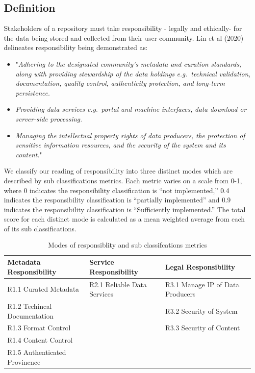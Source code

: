 \documentclass{article}
\begin{document}
\hypertarget{definition}{%
\subsection{Definition}\label{definition}}

Stakeholders of a repository must take responsibility - legally and
ethically- for the data being stored and collected from their user
community. Lin et al (2020) delineates responsibility being demonstrated
as:

\begin{itemize}
\item
  "\emph{Adhering to the designated community's metadata and curation
  standards, along with providing stewardship of the data holdings
  e.g.~technical validation, documentation, quality control,
  authenticity protection, and long-term persistence.}
\item
  \emph{Providing data services e.g.~portal and machine interfaces, data
  download or server-side processing.}
\item
  \emph{Managing the intellectual property rights of data producers, the
  protection of sensitive information resources, and the security of the
  system and its content.}"
\end{itemize}

We classify our reading of responsibility into three distinct modes
which are described by sub classifications metrics. Each metric varies
on a scale from 0-1, where 0 indicates the responsibility classification
is ``not implemented,'' 0.4 indicates the responsibility classification
is ``partially implemented'' and 0.9 indicates the responsibility
classification is ``Sufficiently implemented.'' The total score for each
distinct mode is calculated as a mean weighted average from each of its
sub classifications.

\begin{table}[H]

\caption{\label{tab:fig1}Modes of responsiblity and sub classifcations metrics}
\centering
\begin{tabular}[t]{l|l|l}
\hline
Metadata Responsibility & Service Responsibility & Legal Responsibility\\
\hline
R1.1 Curated Metadata & R2.1 Reliable Data Services & R3.1 Manage IP of Data Producers\\
\hline
R1.2 Techincal Documentation &  & R3.2 Security of System\\
\hline
R1.3 Format Control &  & R3.3 Security of Content\\
\hline
R1.4 Content Control &  & \\
\hline
R1.5 Authenticated Provinence &  & \\
\hline
\end{tabular}
\end{table}
\end{document}
